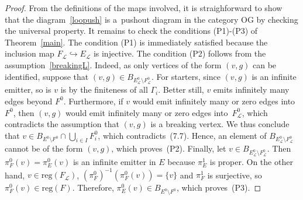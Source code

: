 \documentclass[12pt,times,a4paper]{amsart}
\numberwithin{equation}{section}
\numberwithin{equation}{section}
\begin{document}
\begin{proof}
From the definitions of the maps involved, it is straighforward to show that the diagram~\eqref{loopush} is a~pushout diagram in the category OG by checking the universal property. It remains to check the conditions (P1)-(P3) of Theorem~\ref{main}. The condition (P1) is immediately satisfied because the inclusion map 
$F_{\mathcal{L}}\hookrightarrow E_{\mathcal{L}}$ 
is injective. The condition (P2) follows from the assumption~\eqref{breakingL}. 
Indeed, as only vertices of the form $(v,g)$ can be identified, suppose that $(v,g)\in B_{E^0_\mathcal{L}\setminus F^0_\mathcal{L}}$. For starters, since $(v,g)$ is an infinite emitter, so is $v$ is by the finiteness of all $\Gamma_i$. Better still, $v$ emits infinitely many edges beyond $F^0$.
Furthermore, if $v$ would emit infinitely many or zero edges into $F^0$, then $(v,g)$ would emit infinitely many or zero edges into~$F_\mathcal{L}^0$, which contradicts the assumption that $(v,g)$ is a breaking vertex. We thus conclude that $v\in B_{E^0\setminus F^0} \cap \bigcup_{i\in I}F_i^0$, which contradicts~(7.7). Hence,
an element of $B_{E_\mathcal{L}^0\setminus F_\mathcal{L}^0}$ cannot be of the form $(v,g)$, which proves~(P2).
Finally, let $v\in B_{E_\mathcal{L}^0\setminus F_\mathcal{L}^0}$. Then $\pi_F^0(v)=\pi_E^0(v)$ is an infinite emitter in $E$
because $\pi_E^1$ is proper. On the other hand, $v\in\mathrm{reg}(F_\mathcal{L})$, $(\pi_F^0)^{-1}(\pi_F^0(v))=\{v\}$
and $\pi_F^1$ is surjective, so $\pi_F^0(v)\in\mathrm{reg}(F)$. Therefore, $\pi_E^0(v)\in B_{E^0\setminus F^0}$,
 which proves~(P3).
\end{proof}
\end{document}
